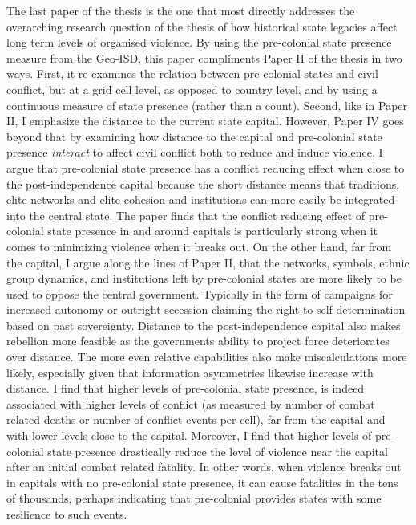 The last paper of the thesis is the one that most directly addresses the
overarching research question of the thesis of how historical state legacies
affect long term levels of organised violence. By using the pre-colonial state
presence measure from the Geo-ISD, this paper compliments Paper II of the thesis
in two ways. First, it re-examines the relation between pre-colonial states and
civil conflict, but at a grid cell level, as opposed to country level, and by
using a continuous measure of state presence (rather than a count). Second, like
in Paper II, I emphasize the distance to the current state capital. However,
Paper IV goes beyond that by examining how distance to the capital and
pre-colonial state presence \textit{interact} to affect civil conflict both to
reduce and induce violence. I argue that pre-colonial state presence has a
conflict reducing effect when close to the post-independence capital because the
short distance means that traditions, elite networks and elite cohesion and
institutions can more easily be integrated into the central state. The paper
finds that the conflict reducing effect of pre-colonial state presence in and
around capitals is particularly strong when it comes to minimizing violence when
it breaks out. On the other hand, far from the capital, I argue along the lines
of Paper II, that the networks, symbols, ethnic group dynamics, and institutions
left by pre-colonial states are more likely to be used to oppose the central
government. Typically in the form of campaigns for increased autonomy or
outright secession claiming the right to self determination based on past
sovereignty. Distance to the post-independence capital also makes rebellion more
feasible as the governments ability to project force deteriorates over distance.
The more even relative capabilities also make miscalculations more likely,
especially given that information asymmetries likewise increase with distance. I
find that higher levels of pre-colonial state presence, is indeed associated
with higher levels of conflict (as measured by number of combat related deaths
or number of conflict events per cell), far from the capital and with lower
levels close to the capital. Moreover, I find that higher levels of pre-colonial
state presence drastically reduce the level of violence near the capital after
an initial combat related fatality. In other words, when violence breaks out in
capitals with no pre-colonial state presence, it can cause fatalities in the
tens of thousands, perhaps indicating that pre-colonial provides states with
some resilience to such events.

